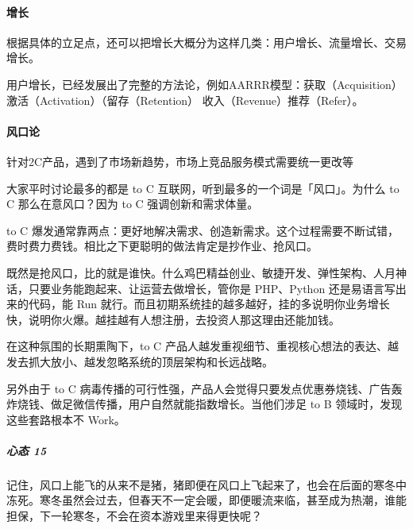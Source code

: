 \documentclass[letterpaper,11pt,english]{sphinxmanual}
\begin{document}
\paragraph{增长}
\label{\detokenize{chapter_introduction/2C:id7}}
根据具体的立足点，还可以把增长大概分为这样几类：用户增长、流量增长、交易增长。

用户增长，已经发展出了完整的方法论，例如AARRR模型：获取（Acquisition）\sphinxhyphen{}
激活（Activation）\sphinxhyphen{}（留存（Retention）\sphinxhyphen{} 收入（Revenue）\sphinxhyphen{}推荐（Refer）。


\paragraph{风口论}
\label{\detokenize{chapter_introduction/2C:id8}}
针对2C产品，遇到了市场新趋势，市场上竞品服务模式需要统一更改等
%
\begin{footnote}[77]\sphinxAtStartFootnote
{}
%
\end{footnote}

大家平时讨论最多的都是 to C 互联网，听到最多的一个词是「风口」。为什么
to C 那么在意风口？因为 to C 强调创新和需求体量。

to C
爆发通常靠两点：更好地解决需求、创造新需求。这个过程需要不断试错，费时费力费钱。相比之下更聪明的做法肯定是抄作业、抢风口。

既然是抢风口，比的就是谁快。什么鸡巴精益创业、敏捷开发、弹性架构、人月神话，只要业务能跑起来、让运营去做增长，管你是
PHP、Python 还是易语言写出来的代码，能 Run
就行。而且初期系统挂的越多越好，挂的多说明你业务增长快，说明你火爆。越挂越有人想注册，去投资人那这理由还能加钱。

在这种氛围的长期熏陶下，to C
产品人越发重视细节、重视核心想法的表达、越发去抓大放小、越发忽略系统的顶层架构和长远战略。

另外由于 to C
病毒传播的可行性强，产品人会觉得只要发点优惠券烧钱、广告轰炸烧钱、做足微信传播，用户自然就能指数增长。当他们涉足
to B 领域时，发现这些套路根本不 Work。


\subparagraph{心态 15\sphinxfootnotemark[78]}
\label{\detokenize{chapter_introduction/2C:id9}}%
\begin{footnotetext}[78]\sphinxAtStartFootnote
{}
%
\end{footnotetext}\ignorespaces 
记住，风口上能飞的从来不是猪，猪即便在风口上飞起来了，也会在后面的寒冬中冻死。寒冬虽然会过去，但春天不一定会暖，即便暖流来临，甚至成为热潮，谁能担保，下一轮寒冬，不会在资本游戏里来得更快呢？
\end{document}
